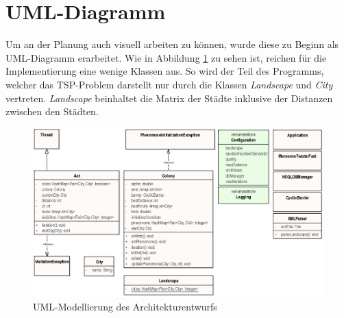 \section{UML-Diagramm}{
	Um an der Planung auch visuell arbeiten zu können, wurde diese zu Beginn als UML-Diagramm erarbeitet. Wie in Abbildung \ref{uml_class} zu sehen ist, reichen für die Implementierung eine wenige Klassen aus. So wird der Teil des Programms, welcher das TSP-Problem darstellt nur durch die Klassen \textit{Landscape} und \textit{City} vertreten.
	\textit{Landscape} beinhaltet die Matrix der Städte inklusive der Distanzen zwischen den Städten.
	\begin{figure}[h]
		\centering
		\includegraphics[width=0.9\linewidth]{images/classModel.eps}
		\caption{UML-Modellierung des Architekturentwurfs}
		\label{uml_class}
	\end{figure}
}